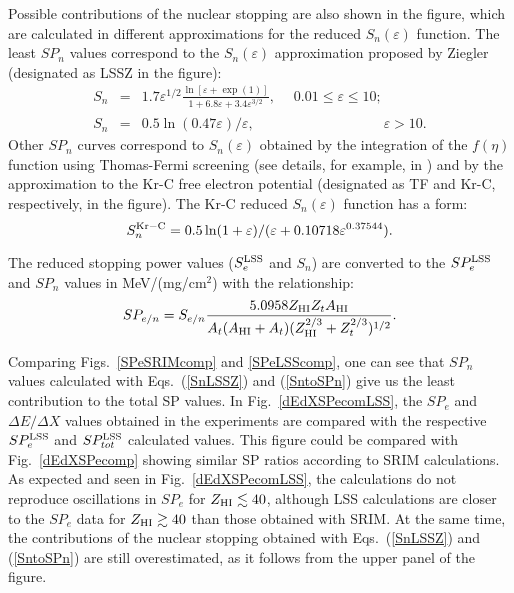 \documentclass[aps,pra,twocolumn,amsmath,amssymb,floatfix]{revtex4-2}
\begin{document}
Possible contributions of the nuclear stopping are also shown in the figure, which are calculated in different approximations for the reduced $S_{n}(\varepsilon)$ function. The least $SP_{n}$ values correspond to the $S_{n}(\varepsilon)$ approximation proposed by Ziegler \cite{Ziegler77} (designated as LSSZ in the figure):
\begin{eqnarray}
  S_{n }  & = &  1.7 \varepsilon^{1/2} \frac{\ln[\varepsilon + \exp(1)]}{1 + 6.8\varepsilon + 3.4\varepsilon^{3/2}}, \phantom{1.7} 0.01\leqslant\varepsilon \leqslant 10;                                 \nonumber             \\
  S_{n }  & = &  0.5 \ln(0.47\varepsilon)/\varepsilon,\phantom{\varepsilon^{1/2}0.5         \ln(0.47\varepsilon)/\varepsilon} \varepsilon > 10.          \label{SnLSSZ}
\end{eqnarray}
Other $SP_{n}$ curves correspond to $S_{n}(\varepsilon)$ obtained by the integration of the $f(\eta)$ function using Thomas-Fermi screening (see details, for example, in \cite{Sigmund04}) and by the approximation to the Kr-C free electron potential \cite{Wilson77} (designated as TF and Kr-C, respectively, in the figure). The Kr-C reduced $S_{n}(\varepsilon)$ function has a form:
\begin{equation}
  S_{n}^{\rm Kr-C} = 0.5 \ln(1 + \varepsilon)/(\varepsilon + 0.10718\varepsilon^{0.37544}).                        \label{SnWHB}
\end{equation}

The reduced stopping power values ($S_{e}^{\rm LSS}$ and $S_{n }$) are converted to the $SP_{e}^{\rm LSS}$ and $SP_{n }$ values in MeV/(mg/cm$^{2}$) with the relationship:
\begin{equation}
  SP_{e/n} = S_{e/n} \frac{5.0958 Z_{\rm HI} Z_{t} A_{\rm HI}}{A_{t}(A_{\rm HI}+A_{t})( Z_{\rm HI}^{2/3} + Z_{t}^{2/3})^{1/2}}.                                                                                                                                        \label{SntoSPn}
\end{equation}

Comparing Figs.~\ref{SPeSRIMcomp} and \ref{SPeLSScomp}, one can see that $SP_{n}$ values calculated with  Eqs.~(\ref{SnLSSZ}) and (\ref{SntoSPn}) give us the least contribution to the total SP values. In Fig.~\ref{dEdXSPecomLSS}, the $SP_{e}$ and $\Delta E/\Delta X$ values obtained in the experiments  \cite{Fastrup66,Hvelp68,Lennard86} are compared with the respective $SP_{e}^{\rm LSS}$ and $SP_{tot}^{\rm LSS}$ calculated values. This figure could be compared with Fig.~\ref{dEdXSPecomp} showing similar SP ratios according to SRIM calculations. As expected and seen in Fig.~\ref{dEdXSPecomLSS}, the calculations do not reproduce oscillations in $SP_{e}$ for $Z_{\rm HI} \lesssim 40$, although LSS calculations are closer to the $SP_{e}$ data for $Z_{\rm HI} \gtrsim 40$ than those obtained with SRIM. At the same time, the contributions of the nuclear stopping obtained with Eqs.~(\ref{SnLSSZ}) and (\ref{SntoSPn}) are still overestimated, as it follows from the upper panel of the figure.
\end{document}
